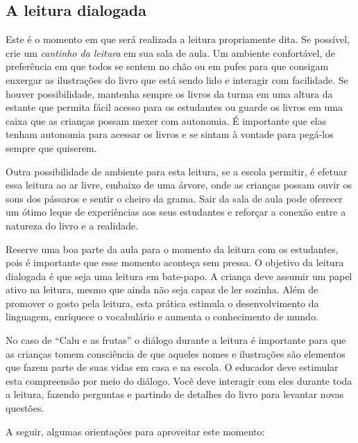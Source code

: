 \documentclass[11pt]{extarticle}
\begin{document}
\subsection{A leitura dialogada}
Este é o momento em que será realizada a leitura propriamente dita. 
Se possível, crie um \textit{cantinho da leitura} em sua sala de aula. Um 
ambiente confortável, de preferência em que todos se sentem no chão ou 
em pufes para que consigam enxergar as ilustrações do livro que está 
sendo lido e interagir com facilidade. Se houver possibilidade, mantenha 
sempre os livros da turma em uma altura da estante que permita fácil 
acesso para os estudantes ou guarde os livros em uma caixa que as crianças 
possam mexer com autonomia. É importante que elas tenham autonomia para 
acessar os livros e se sintam à vontade para pegá-los sempre que quiserem. 


Outra possibilidade de ambiente para esta leitura, se a escola permitir, 
é efetuar essa leitura ao ar livre, embaixo de uma árvore, onde as crianças 
possam ouvir os sons dos pássaros e sentir o cheiro da grama. Sair da sala 
de aula pode oferecer um ótimo leque de experiências aos seus estudantes e 
reforçar a conexão entre a natureza do livro e a realidade.  

Reserve uma boa parte da aula para o momento da leitura com os estudantes, 
pois é importante que esse momento aconteça sem pressa. O objetivo da 
leitura dialogada é que seja uma leitura em bate-papo. A criança deve 
assumir um papel ativo na leitura, mesmo que ainda não seja capaz de 
ler sozinha. Além de promover o gosto pela leitura, esta prática estimula 
o desenvolvimento da linguagem, enriquece o vocabulário e 
aumenta o conhecimento de mundo.

No caso de “Calu e as frutas” o diálogo durante a leitura é 
importante para que as crianças tomem consciência de que aqueles
nomes e ilustrações são elementos que fazem parte de suas vidas
em casa e na escola. O educador deve estimular esta compreensão por meio
do diálogo.
Você deve interagir com eles durante toda a 
leitura, fazendo perguntas e partindo de detalhes do livro para 
levantar novas questões. 

A seguir, algumas orientações para aproveitar este momento: 
\end{document}
